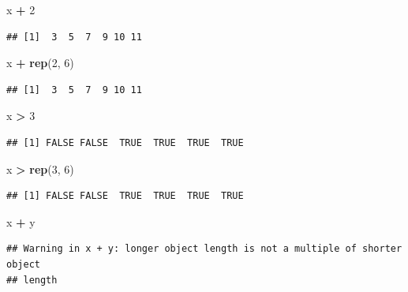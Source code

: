 \documentclass[]{book}
\newenvironment{Shaded}{\begin{snugshade}}{\end{snugshade}}
\newcommand{\KeywordTok}[1]{\textcolor[rgb]{0.13,0.29,0.53}{\textbf{#1}}}
\newcommand{\DecValTok}[1]{\textcolor[rgb]{0.00,0.00,0.81}{#1}}
\newcommand{\StringTok}[1]{\textcolor[rgb]{0.31,0.60,0.02}{#1}}
\newcommand{\OperatorTok}[1]{\textcolor[rgb]{0.81,0.36,0.00}{\textbf{#1}}}
\newcommand{\NormalTok}[1]{#1}
\theoremstyle{definition}
\theoremstyle{definition}
\theoremstyle{definition}
\theoremstyle{remark}
\begin{document}
\begin{Shaded}
\begin{Highlighting}[]
\NormalTok{x }\OperatorTok{+}\StringTok{ }\DecValTok{2}
\end{Highlighting}
\end{Shaded}

\begin{verbatim}
## [1]  3  5  7  9 10 11
\end{verbatim}

\begin{Shaded}
\begin{Highlighting}[]
\NormalTok{x }\OperatorTok{+}\StringTok{ }\KeywordTok{rep}\NormalTok{(}\DecValTok{2}\NormalTok{, }\DecValTok{6}\NormalTok{)}
\end{Highlighting}
\end{Shaded}

\begin{verbatim}
## [1]  3  5  7  9 10 11
\end{verbatim}

\begin{Shaded}
\begin{Highlighting}[]
\NormalTok{x }\OperatorTok{>}\StringTok{ }\DecValTok{3}
\end{Highlighting}
\end{Shaded}

\begin{verbatim}
## [1] FALSE FALSE  TRUE  TRUE  TRUE  TRUE
\end{verbatim}

\begin{Shaded}
\begin{Highlighting}[]
\NormalTok{x }\OperatorTok{>}\StringTok{ }\KeywordTok{rep}\NormalTok{(}\DecValTok{3}\NormalTok{, }\DecValTok{6}\NormalTok{)}
\end{Highlighting}
\end{Shaded}

\begin{verbatim}
## [1] FALSE FALSE  TRUE  TRUE  TRUE  TRUE
\end{verbatim}

\begin{Shaded}
\begin{Highlighting}[]
\NormalTok{x }\OperatorTok{+}\StringTok{ }\NormalTok{y}
\end{Highlighting}
\end{Shaded}

\begin{verbatim}
## Warning in x + y: longer object length is not a multiple of shorter object
## length
\end{verbatim}
\end{document}

